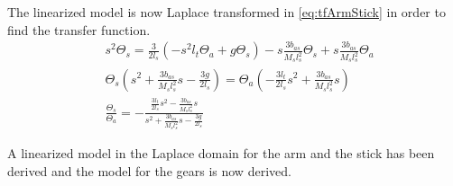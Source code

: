 		The linearized model is now Laplace transformed in \autoref{eq:tfArmStick} in order to find the transfer function.
		\begin{subequations}
			\begin{flalign}
				& s^2\Theta_s=\frac{3}{2l_s}\left(-s^2l_t\Theta_a+g\Theta_s\right)-s\frac{3b_{as}}{M_sl_s^2}\Theta_s+s\frac{3b_{as}}{M_sl_s^2}\Theta_a  \\
				& \Theta_s\left(s^2+\frac{3b_{as}}{M_sl_s^2}s-\frac{3g}{2l_s}\right)=\Theta_a\left(-\frac{3l_t}{2l_s}s^2+\frac{3b_{as}}{M_sl_s^2}s\right)  \\
				& \frac{\Theta_s}{\Theta_a}=-\frac{\frac{3l_t}{2l_s}s^2-\frac{3b_{as}}{M_sl_s^2}s}{s^2+\frac{3b_{as}}{M_sl_s^2}s-\frac{3g}{2l_s}} \label{eq:tfArmStick}
			\end{flalign}
		\end{subequations}
		
		A linearized model in the Laplace domain for the arm and the stick has been derived and the model for the gears is now derived.



